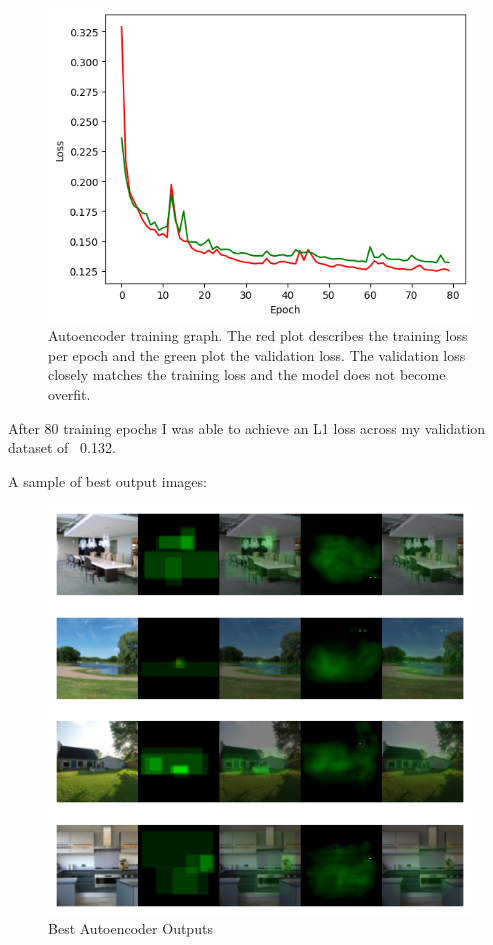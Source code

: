 \documentclass{UoYCSproject}
\begin{document}
\begin{figure}[h]
    \centering
    \includegraphics[width=\linewidth]{Autoencoder Training Curve}
    \caption{Autoencoder training graph. The red plot describes the training loss per epoch and the green plot the validation loss. The validation loss closely matches the training loss and the model does not become overfit.}
    \label{fig:autoencoderTraining}
\end{figure}


After 80 training epochs I was able to achieve an L1 loss across my validation dataset of ~0.132.

A sample of best output images:

\begin{figure}[h]
    \centering
    \includegraphics[width=\linewidth]{Best autoencoder Outputs}
    \caption{Best Autoencoder Outputs}
    \label{fig:autoencoderBestOutput}
\end{figure}
\end{document}
